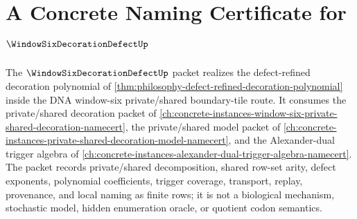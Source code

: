 \chapter{A Concrete Naming Certificate for $\WindowSixDecorationDefectUp$}
\label{ch:concrete-instances-window-six-decoration-defect-namecert}

The $\WindowSixDecorationDefectUp$ packet realizes the defect-refined decoration polynomial of \autoref{thm:philosophy-defect-refined-decoration-polynomial} inside the DNA window-six private/shared boundary-tile route. It consumes the private/shared decoration packet of \autoref{ch:concrete-instances-window-six-private-shared-decoration-namecert}, the private/shared model packet of \autoref{ch:concrete-instances-private-shared-decoration-model-namecert}, and the Alexander-dual trigger algebra of \autoref{ch:concrete-instances-alexander-dual-trigger-algebra-namecert}. The packet records private/shared decomposition, shared row-set arity, defect exponents, polynomial coefficients, trigger coverage, transport, replay, provenance, and local naming as finite rows; it is not a biological mechanism, stochastic model, hidden enumeration oracle, or quotient codon semantics.

